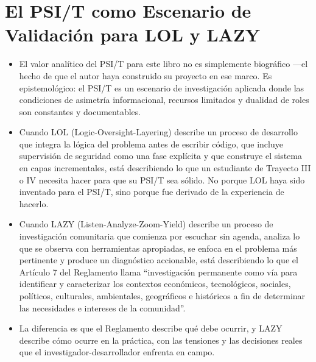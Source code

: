 \documentclass[14pt,a4paper,oneside]{extbook}
\begin{document}
\section{El PSI/T como Escenario de Validación para LOL y LAZY}
\begin{itemize}
\item El valor analítico del PSI/T para este libro no es simplemente biográfico ---el hecho de que el autor haya construido su proyecto en ese marco. Es epistemológico: el PSI/T es un escenario de investigación aplicada donde las condiciones de asimetría informacional, recursos limitados y dualidad de roles son constantes y documentables.
\item Cuando LOL (Logic-Oversight-Layering) describe un proceso de desarrollo que integra la lógica del problema antes de escribir código, que incluye supervisión de seguridad como una fase explícita y que construye el sistema en capas incrementales, está describiendo lo que un estudiante de Trayecto III o IV necesita hacer para que su PSI/T sea sólido. No porque LOL haya sido inventado para el PSI/T, sino porque fue derivado de la experiencia de hacerlo.
\item Cuando LAZY (Listen-Analyze-Zoom-Yield) describe un proceso de investigación comunitaria que comienza por escuchar sin agenda, analiza lo que se observa con herramientas apropiadas, se enfoca en el problema más pertinente y produce un diagnóstico accionable, está describiendo lo que el Artículo 7 del Reglamento llama \enquote{investigación permanente como vía para identificar y caracterizar los contextos económicos, tecnológicos, sociales, políticos, culturales, ambientales, geográficos e históricos a fin de determinar las necesidades e intereses de la comunidad}.
\item La diferencia es que el Reglamento describe qué debe ocurrir, y LAZY describe cómo ocurre en la práctica, con las tensiones y las decisiones reales que el investigador-desarrollador enfrenta en campo.
\end{itemize}
\end{document}
